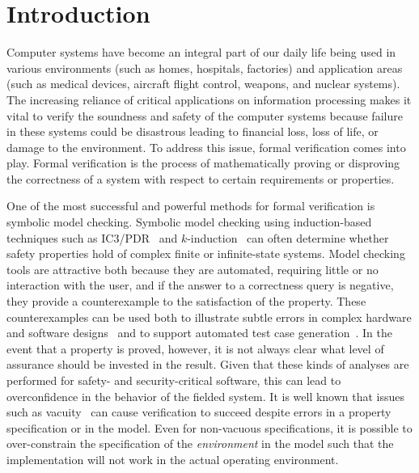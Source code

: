 \chapter{Introduction}

Computer systems have become an integral part of our daily life being used in various environments (such as homes, hospitals, factories) and application areas (such as medical devices, aircraft flight control, weapons, and nuclear systems). The increasing reliance of critical applications on information processing makes it vital to verify the soundness and safety of the computer systems because failure in these systems could be disastrous leading to financial loss, loss of life, or damage to the environment. To address this issue, formal verification comes into play. Formal verification is the process of mathematically proving or disproving the correctness of a system with respect to certain requirements or properties.

One of the most successful and powerful methods for formal verification is symbolic model checking. Symbolic model checking using induction-based techniques such as IC3/PDR~\cite{Een2011:PDR} and $k$-induction~\cite{SheeranSS00} can often determine whether safety properties hold of complex finite or infinite-state systems.  Model checking tools are attractive both because they are automated, requiring little or no interaction with the user, and if the answer to a correctness query is negative, they provide a counterexample to the satisfaction of the property.  These counterexamples can be used both to illustrate subtle errors in complex hardware and software designs~\cite{hilt2013,McMillan99:compositional, Miller10:CACM} and to support automated test case generation~\cite{Whalen13:OMCDC, You15:dse}.
In the event that a property is proved, however, it is not always clear what level of assurance should be invested in the result.  Given that these kinds of analyses are performed for safety- and security-critical software, this can lead to overconfidence in the behavior of the fielded system.  It is well known that issues such as vacuity~\cite{Kupferman03:Vacuity} can cause verification to succeed despite errors in a property specification or in the model. Even for non-vacuous specifications, it is possible to over-constrain the specification of the {\em environment} in the model such that the implementation will not work in the actual operating environment. 

